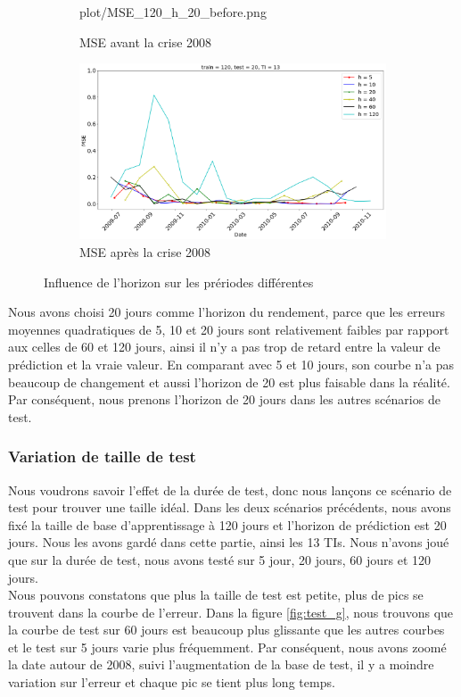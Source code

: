 \begin{figure}[H]
\begin{subfigure}{.5\textwidth}
	{plot/MSE_120_h_20_before.png}
	\caption{MSE avant la crise 2008}
	\label{fig:Horizon_before}
	\end{subfigure}%
	\begin{subfigure}{.5\textwidth}
	\centering
	\includegraphics[width=.9\linewidth, scale=0.2]
	{plot/MSE_120_h_20_after.png}
	\caption{MSE après la crise 2008}
	\label{fig:Horizon_after}
	\end{subfigure}
\caption{Influence de l'horizon sur les prériodes différentes}
\label{fig:MSE_horizon}
\end{figure}

Nous avons choisi 20 jours comme l'horizon du rendement, parce que les erreurs moyennes quadratiques de 5, 10 et 20 jours sont relativement faibles par rapport aux celles de 60 et 120 jours, ainsi il n'y a pas trop de retard entre la valeur de prédiction et la vraie valeur. En comparant avec 5 et 10 jours, son courbe n'a pas beaucoup de changement et aussi l'horizon de 20 est plus faisable dans la réalité. Par conséquent, nous prenons l'horizon de 20 jours dans les autres scénarios de test.

\subsubsection{Variation de taille de test}

Nous voudrons savoir l'effet de la durée de test, donc nous lançons ce scénario de test pour trouver une taille idéal. Dans les deux scénarios précédents, nous avons fixé la taille de base d'apprentissage à 120 jours et l'horizon de prédiction est 20 jours. Nous les avons gardé dans cette partie, ainsi les 13 TIs. Nous n'avons joué que sur la durée de test, nous avons testé sur 5 jour, 20 jours, 60 jours et 120 jours. \\ 

Nous pouvons constatons que plus la taille de test est petite, plus de pics se trouvent dans la courbe de l'erreur. Dans la figure \ref{fig:test_g}, nous trouvons que la courbe de test sur 60 jours est beaucoup plus glissante que les autres courbes et le test sur 5 jours varie plus fréquemment. Par conséquent, nous avons zoomé la date autour de 2008, suivi l'augmentation de la base de test, il y a moindre variation sur l'erreur et chaque pic se tient plus long temps.  \\

